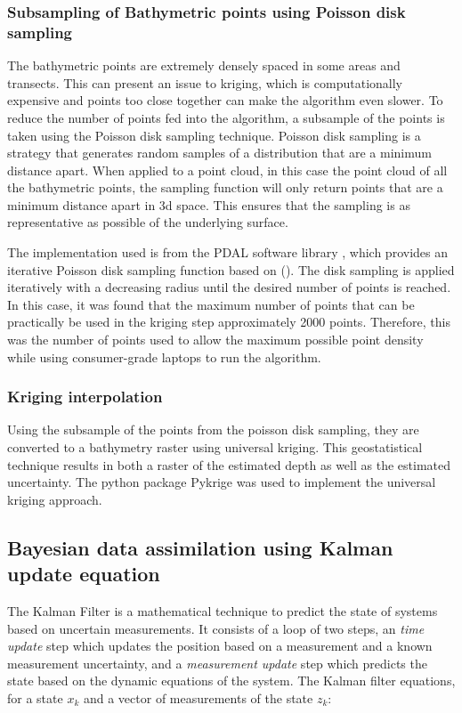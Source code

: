 \subsubsection{Subsampling of Bathymetric points using Poisson disk sampling}  \label{subsec:poissonsubsampling}
The bathymetric points are extremely densely spaced in some areas and transects. This can present an issue to kriging, which is computationally expensive and points too close together can make the algorithm even slower. To reduce the number of points fed into the algorithm, a subsample of the points is taken using the Poisson disk sampling technique. Poisson disk sampling is a strategy that generates random samples of a distribution that are a minimum distance apart. When applied to a point cloud, in this case the point cloud of all the bathymetric points, the sampling function will only return points that are a minimum distance apart in 3d space. This ensures that the sampling is as representative as possible of the underlying surface.

The implementation used is from the PDAL software library \parencite{howard_butler_2022_6369164}, which provides an iterative Poisson disk sampling function based on \citeauthor{McCool1992} (\citeyear{McCool1992}). The disk sampling is applied iteratively with a decreasing radius until the desired number of points is reached. In this case, it was found that the maximum number of points that can be practically be used in the kriging step approximately 2000 points. Therefore, this was the number of points used to allow the maximum possible point density while using consumer-grade laptops to run the algorithm. 

\subsubsection{Kriging interpolation}
Using the subsample of the points from the poisson disk sampling, they are converted to a bathymetry raster using universal kriging. This geostatistical technique results in both a raster of the estimated depth as well as the estimated uncertainty. The python package Pykrige \parencite{benjamin_murphy_2021_5380342} was used to implement the universal kriging approach. 


\subsection{Bayesian data assimilation using Kalman update equation}
The Kalman Filter is a mathematical technique to predict the state of systems based on uncertain measurements. It consists of a loop of two steps, an \emph{time update} step which updates the position based on a measurement and a known measurement uncertainty, and a \emph{measurement update} step which predicts the state based on the dynamic equations of the system. The Kalman filter equations, for a state $x_k$ and a vector of measurements of the state $z_k$:

